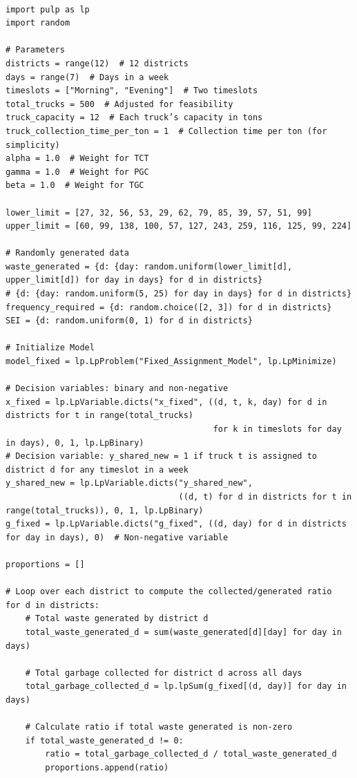 \documentclass{article}
\begin{document}
\begin{verbatim}

import pulp as lp
import random

# Parameters
districts = range(12)  # 12 districts
days = range(7)  # Days in a week
timeslots = ["Morning", "Evening"]  # Two timeslots
total_trucks = 500  # Adjusted for feasibility
truck_capacity = 12  # Each truck’s capacity in tons
truck_collection_time_per_ton = 1  # Collection time per ton (for simplicity)
alpha = 1.0  # Weight for TCT
gamma = 1.0  # Weight for PGC
beta = 1.0  # Weight for TGC

lower_limit = [27, 32, 56, 53, 29, 62, 79, 85, 39, 57, 51, 99]
upper_limit = [60, 99, 138, 100, 57, 127, 243, 259, 116, 125, 99, 224]

# Randomly generated data
waste_generated = {d: {day: random.uniform(lower_limit[d], upper_limit[d]) for day in days} for d in districts}
# {d: {day: random.uniform(5, 25) for day in days} for d in districts}
frequency_required = {d: random.choice([2, 3]) for d in districts}
SEI = {d: random.uniform(0, 1) for d in districts}

# Initialize Model
model_fixed = lp.LpProblem("Fixed_Assignment_Model", lp.LpMinimize)

# Decision variables: binary and non-negative
x_fixed = lp.LpVariable.dicts("x_fixed", ((d, t, k, day) for d in districts for t in range(total_trucks)
                                          for k in timeslots for day in days), 0, 1, lp.LpBinary)
# Decision variable: y_shared_new = 1 if truck t is assigned to district d for any timeslot in a week
y_shared_new = lp.LpVariable.dicts("y_shared_new",
                                   ((d, t) for d in districts for t in range(total_trucks)), 0, 1, lp.LpBinary)
g_fixed = lp.LpVariable.dicts("g_fixed", ((d, day) for d in districts for day in days), 0)  # Non-negative variable

proportions = []

# Loop over each district to compute the collected/generated ratio
for d in districts:
    # Total waste generated by district d
    total_waste_generated_d = sum(waste_generated[d][day] for day in days)

    # Total garbage collected for district d across all days
    total_garbage_collected_d = lp.lpSum(g_fixed[(d, day)] for day in days)

    # Calculate ratio if total waste generated is non-zero
    if total_waste_generated_d != 0:
        ratio = total_garbage_collected_d / total_waste_generated_d
        proportions.append(ratio)


\end{verbatim}
\end{document}
